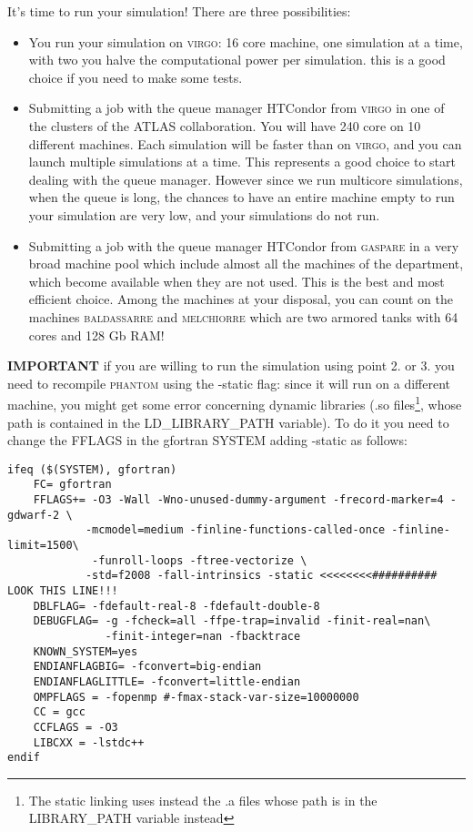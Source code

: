 \documentclass[10pt,a4paper,twoside]{article} %
\begin{document}
It's time to run your simulation! There are three possibilities: 

\begin{itemize}
\item[1.] You run your simulation on \textsc{virgo}: 16 core machine, one simulation at a time, with two you halve the computational power per simulation. this is a good choice if you need to make some tests.

\item[2.] Submitting a job with the queue manager HTCondor from \textsc{virgo} in one of the clusters of the ATLAS collaboration. You will have 240 core on 10 different machines. Each simulation will be faster than on \textsc{virgo}, and you can launch multiple simulations at a time. This represents a good choice to start dealing with the queue manager. However since we run multicore simulations, when the queue is long, the chances to have an entire machine empty to run your simulation are very low, and your simulations do not run.

\item[3.] Submitting a job with the queue manager HTCondor from \textsc{gaspare} in a very broad machine pool which include almost all the machines of the department, which become available when they are not used. This is the best and most efficient choice. Among the machines at your disposal, you can count on the machines \textsc{baldassarre} and \textsc{melchiorre} which are two armored tanks with 64 cores and 128 Gb RAM!
\end{itemize}

\textbf{IMPORTANT} if you are willing to run the simulation using point 2. or 3. you need to recompile \textsc{phantom} using the -static flag: since it will run on a different machine, you might get some error concerning dynamic libraries (.so files\footnote{The static linking uses instead the .a files whose path is in the LIBRARY\_PATH variable instead}, whose path is contained in the LD\_LIBRARY\_PATH variable). To do it you need to change the FFLAGS in the gfortran SYSTEM adding -static as follows:

\begin{verbatim}
ifeq ($(SYSTEM), gfortran)
    FC= gfortran
    FFLAGS+= -O3 -Wall -Wno-unused-dummy-argument -frecord-marker=4 -gdwarf-2 \
            -mcmodel=medium -finline-functions-called-once -finline-limit=1500\
             -funroll-loops -ftree-vectorize \
            -std=f2008 -fall-intrinsics -static <<<<<<<<########## LOOK THIS LINE!!!
    DBLFLAG= -fdefault-real-8 -fdefault-double-8
    DEBUGFLAG= -g -fcheck=all -ffpe-trap=invalid -finit-real=nan\
               -finit-integer=nan -fbacktrace
    KNOWN_SYSTEM=yes
    ENDIANFLAGBIG= -fconvert=big-endian
    ENDIANFLAGLITTLE= -fconvert=little-endian
    OMPFLAGS = -fopenmp #-fmax-stack-var-size=10000000
    CC = gcc
    CCFLAGS = -O3
    LIBCXX = -lstdc++
endif
\end{verbatim}
\end{document}
